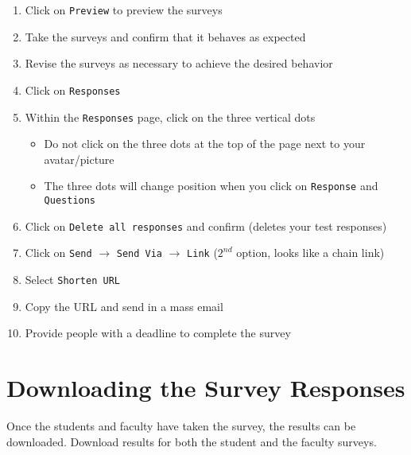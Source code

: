 \begin{enumerate}
	\item Click on \texttt{Preview} to preview the surveys
	\item Take the surveys and confirm that it behaves as expected
	\item Revise the surveys as necessary to achieve the desired behavior
	\item Click on \texttt{Responses}
	\item Within the \texttt{Responses} page, click on the three vertical dots
		\begin{itemize}
			\item Do not click on the three dots at the top of the page next to your avatar/picture
			\item The three dots will change position when you click on \texttt{Response} and \texttt{Questions}
		\end{itemize}
	\item Click on \texttt{Delete all responses} and confirm (deletes your test responses)
	\item Click on \texttt{Send} $\rightarrow$ \texttt{Send Via} $\rightarrow$ \texttt{Link} ($2^{nd}$ option, looks like a chain link)
	\item Select \texttt{Shorten URL}
	\item Copy the URL and send in a mass email
	\item Provide people with a deadline to complete the survey
\end{enumerate}


%
%
\section{Downloading the Survey Responses}

Once the students and faculty have taken the survey, the results can be downloaded.  Download results for both the student and the faculty surveys.

